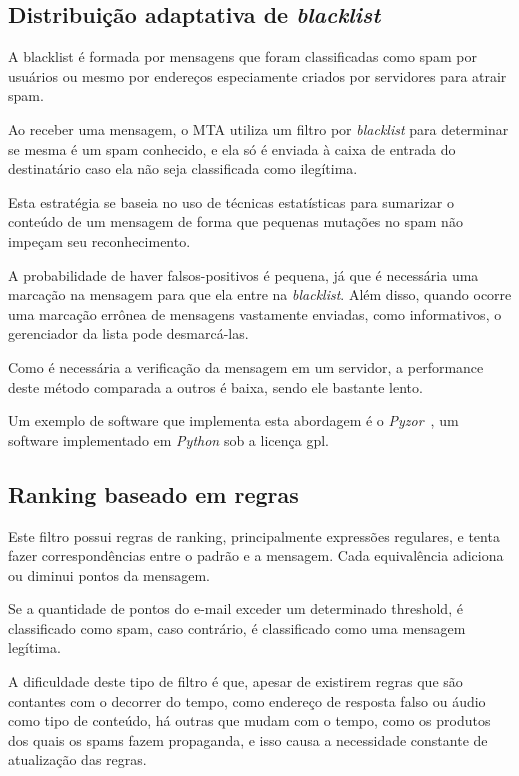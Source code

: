 \documentclass[a4paper,dvipdfm]{article}
\begin{document}
	\subsection{Distribuição adaptativa de \emph{blacklist}}
		A \gls{blacklist} é formada por mensagens que foram classificadas como spam por usuários ou mesmo por endereços especiamente criados por servidores para atrair spam.

		Ao receber uma mensagem, o MTA utiliza um filtro por \emph{blacklist} para determinar se mesma é um spam conhecido, e ela só é enviada à caixa de entrada do destinatário caso ela não seja classificada como ilegítima.

		Esta estratégia se baseia no uso de técnicas estatísticas para sumarizar o conteúdo de um mensagem de forma que pequenas mutações no spam não impeçam seu reconhecimento.

		A probabilidade de haver falsos-positivos é pequena, já que é necessária uma marcação na mensagem para que ela entre na \emph{blacklist}. Além disso, quando ocorre uma marcação errônea de mensagens vastamente enviadas, como informativos, o gerenciador da lista pode desmarcá-las.
		
		Como é necessária a verificação da mensagem em um servidor, a performance deste método comparada a outros é baixa, sendo ele bastante lento.

		Um exemplo de software que implementa esta abordagem é o \emph{Pyzor}~\cite{pyzor}, um software implementado em \emph{Python} sob a licença \gls{gpl}.

	\subsection{Ranking baseado em regras}
		Este filtro possui regras de ranking, principalmente expressões regulares, e tenta fazer correspondências entre o padrão e a mensagem. 
		Cada equivalência adiciona ou diminui pontos da mensagem.
		
		Se a quantidade de pontos do e-mail exceder um determinado \gls{threshold}, é classificado como spam, caso contrário, é classificado como uma mensagem legítima.

		A dificuldade deste tipo de filtro é que, apesar de existirem regras que são contantes com o decorrer do tempo, como endereço de resposta falso ou áudio como tipo de conteúdo, há outras que mudam com o tempo, como os produtos dos quais os spams fazem propaganda, e isso causa a necessidade constante de atualização das regras.
\end{document}
